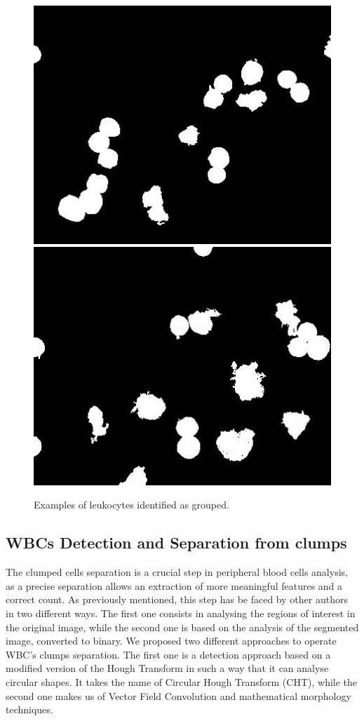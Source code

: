 \documentclass[final,a4paper,12pt,english]{UnicaPhdThesis3}
\begin{document}
\begin{figure}[!htbp]
\centering
\includegraphics[height=0.27\textheight]{images/Fig12-1}
\includegraphics[height=0.27\textheight]{images/Fig12-2}
\caption{\label{fig:example10}Examples of leukocytes identified as grouped.}
\end{figure}

\subsection{WBCs Detection and Separation from clumps}
The clumped cells separation is a crucial step in peripheral blood cells analysis, as a precise separation allows an extraction of more meaningful features and a correct count. As previously mentioned, this step has be faced by other authors in two different ways. The first one consists in analysing the regions of interest in the original image, while the second one is based on the analysis of the segmented image, converted to binary. We proposed two different approaches to operate WBC's clumps separation. The first one is a detection approach based on a modified version of the Hough Transform in such a way that it can analyse circular shapes. It takes the name of Circular Hough Transform (CHT), while the second one makes us of Vector Field Convolution and mathematical morphology techniques. 
\end{document}
